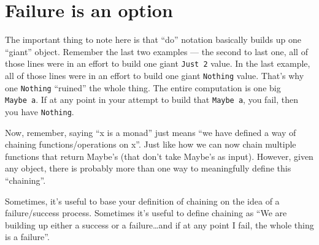 \documentclass[]{article}
\begin{document}
\section{Failure is an option}\label{failure-is-an-option}

The important thing to note here is that ``do'' notation basically
builds up one ``giant'' object. Remember the last two examples --- the
second to last one, all of those lines were in an effort to build one
giant \texttt{Just\ 2} value. In the last example, all of those lines
were in an effort to build one giant \texttt{Nothing} value. That's why
one \texttt{Nothing} ``ruined'' the whole thing. The entire computation
is one big \texttt{Maybe\ a}. If at any point in your attempt to build
that \texttt{Maybe\ a}, you fail, then you have \texttt{Nothing}.

Now, remember, saying ``x is a monad'' just means ``we have defined a
way of chaining functions/operations on x''. Just like how we can now
chain multiple functions that return Maybe's (that don't take Maybe's as
input). However, given any object, there is probably more than one way
to meaningfully define this ``chaining''.

Sometimes, it's useful to base your definition of chaining on the idea
of a failure/success process. Sometimes it's useful to define chaining
as ``We are building up either a success or a failure\ldots{}and if at
any point I fail, the whole thing is a failure''.
\end{document}
